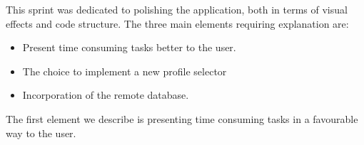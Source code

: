 This sprint was dedicated to polishing the application, both in terms of visual effects and code structure.
The three main elements requiring explanation are:

\begin{itemize}
\item Present time consuming tasks better to the user.
\item The choice to implement a new profile selector
\item Incorporation of the remote database.
\end{itemize}

The first element we describe is presenting time consuming tasks in a favourable way to the user.



